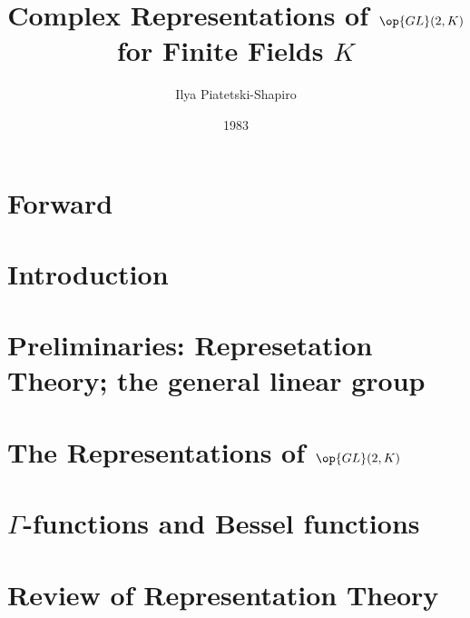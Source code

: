 \documentclass[openany]{book}
\title{Complex Representations of \texorpdfstring{$\op{GL}(2,K)$}{GL(2,K)} for Finite Fields \texorpdfstring{$K$}{K}}
\author{Ilya Piatetski-Shapiro}
\date{1983}
\begin{document}
\maketitle

\toctrue
\tableofcontents
\tocfalse

\newpage

\toctrue
\chapter*{Forward}
\tocfalse



\toctrue
\chapter*{Introduction} 
\tocfalse



\chapter{Preliminaries: Represetation Theory; the general linear group}



\chapter{The Representations of \texorpdfstring{$\op{GL}(2,K)$}{GL2(K)}}



\chapter{\texorpdfstring{$\Gamma$}{Gamma}-functions and Bessel functions}



\appendix

\chapter{Review of Representation Theory}


\end{document}
